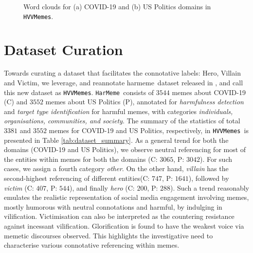 \documentclass[11pt]{article}
\newcommand{\dataset}{\textcolor{black}{\texttt{HVVMemes}}}
\newcommand{\harmeme}{\texttt{HarMeme}}
\begin{document}
\begin{figure}[t!]
\centering
{}\hspace{0.1mm}
\hspace{0.1mm}
\caption{Word clouds for (a) COVID-19 and (b) US Politics domains in \dataset.}
\label{fig:gen_stat}
\end{figure}
\section{Dataset Curation}
\label{sec:dataset}
Towards curating a dataset that facilitates the connotative labels: Hero, Villain and Victim, we leverage, and reannotate harmeme\ dataset released in 
\cite{pramanick-etal-2021-momenta-multimodal}, and call this new dataset as \dataset.
\harmeme\ consists of $3544$ memes about COVID-19 (C) and $3552$ memes about US Politics (P), annotated for \textit{harmfulness detection} and \textit{target type identification} for harmful memes, with categories  \textit{individuals, organisations, communities, and society}. 
The summary of the statistics of total $3381$ and $3552$ memes for COVID-19 and US Politics, respectively, in \dataset\ is presented in Table \ref{tab:dataset_summary}. As a general trend for both the domains (COVID-19 and US Politics), we observe neutral referencing for most of the entities within memes for both the domains (C: $3065$, P: $3042$). For such cases, we assign a fourth category \textit{other}. On the other hand, \textit{villain} has the second-highest referencing of different entities(C: $747$, P: $1641$), followed by \textit{victim} (C: $407$, P: $544$), and finally \textit{hero} (C: $200$, P: $288$). Such a trend reasonably emulates the realistic representation of social media engagement involving memes, mostly humorous with neutral connotations and harmful, by indulging in vilification. Victimisation can also be interpreted as the countering resistance against incessant vilification. Glorification is found to have the weakest voice via memetic discourses observed. This highlights the investigative need to characterise various connotative referencing within memes.
\end{document}
